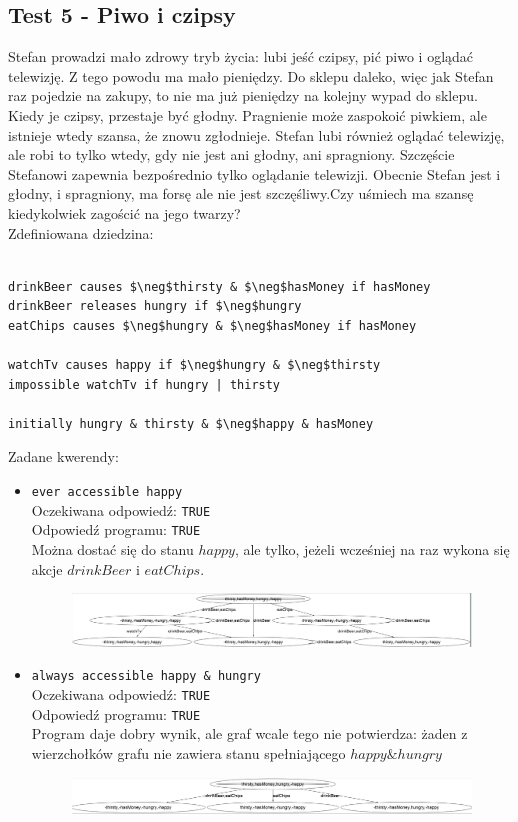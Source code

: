 \documentclass{article}
\begin{document}
\subsection{Test 5 - Piwo i czipsy}
Stefan prowadzi mało zdrowy tryb życia: lubi jeść czipsy, pić piwo i oglądać telewizję. Z tego powodu ma mało pieniędzy. Do sklepu daleko, więc jak Stefan raz pojedzie na zakupy, to nie ma już pieniędzy na kolejny wypad do sklepu. Kiedy je czipsy, przestaje być głodny. Pragnienie może zaspokoić piwkiem, ale istnieje wtedy szansa, że znowu zgłodnieje. Stefan lubi również oglądać telewizję, ale robi to tylko wtedy, gdy nie jest ani głodny, ani spragniony. Szczęście Stefanowi zapewnia bezpośrednio tylko oglądanie telewizji. Obecnie Stefan jest i głodny, i spragniony, ma forsę ale nie jest szczęśliwy.Czy uśmiech ma szansę kiedykolwiek zagościć na jego twarzy?\\
Zdefiniowana dziedzina:
\bigskip
{}
\begin{lstlisting}[mathescape=true]

drinkBeer causes $\neg$thirsty & $\neg$hasMoney if hasMoney
drinkBeer releases hungry if $\neg$hungry
eatChips causes $\neg$hungry & $\neg$hasMoney if hasMoney

watchTv causes happy if $\neg$hungry & $\neg$thirsty
impossible watchTv if hungry | thirsty

initially hungry & thirsty & $\neg$happy & hasMoney
\end{lstlisting}
\vspace{1cm}
Zadane kwerendy:
\begin{itemize}
	\item {\large\texttt{ever accessible happy}}\\
	Oczekiwana odpowiedź: \texttt{TRUE}\\
	Odpowiedź programu: \texttt{TRUE}\\
	Można dostać się do stanu $happy$, ale tylko, jeżeli wcześniej na raz wykona się akcje $drinkBeer$ i $eatChips$.
	\begin{figure}[H]
		\centering
		\includegraphics[scale=0.3]{stefan1}
	\end{figure}
	\item {\large\texttt{always accessible happy \& hungry}}\\
	Oczekiwana odpowiedź: \texttt{TRUE}\\
	Odpowiedź programu: \texttt{TRUE}\\
	Program daje dobry wynik, ale graf wcale tego nie potwierdza: żaden z wierzchołków grafu nie zawiera stanu spełniającego $happy \& hungry$
	\begin{figure}[H]
		\centering
		\includegraphics[scale=0.3]{stefan2}
	\end{figure}
\end{itemize}
\end{document}
